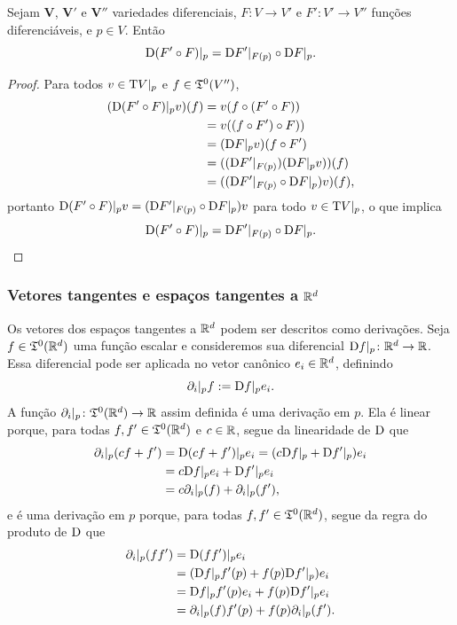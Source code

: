 \begin{proposition}
Sejam $\bm V$, $\bm V'$ e $\bm V''$ variedades diferenciais, $F\colon V \to V'$ e $F'\colon V' \to V''$ funções diferenciáveis, e $p \in V$. Então
	\begin{equation*}
	\mathrm{D}(F' \circ F)|_{p} = \mathrm{D} F'|_{F(p)} \circ \mathrm{D} F|_{p}.
	\end{equation*}
\end{proposition}
\begin{proof}
Para todos $v \in \mathrm{T} V|_p$ e $f \in \mathfrak{T}^0(V'')$,
	\begin{align*}
	(\mathrm{D}(F' \circ F)|_{p} v)(f) &= v(f \circ (F' \circ F)) \\
		&= v((f \circ F') \circ F)) \\
		&= (\mathrm{D} F|_p v)(f \circ F') \\
		&= ((\mathrm{D} F'|_{F(p)})(\mathrm{D} F|_{p} v))(f) \\
		&= ((\mathrm{D} F'|_{F(p)} \circ \mathrm{D} F|_{p}) v)(f),
	\end{align*}
portanto $\mathrm{D}(F' \circ F)|_{p}v = (\mathrm{D} F'|_{F(p)} \circ \mathrm{D} F|_{p})v$ para todo $v \in \mathrm{T} V|_p$, o que implica
	\begin{equation*}
	\mathrm{D}(F' \circ F)|_{p} = \mathrm{D} F'|_{F(p)} \circ \mathrm{D} F|_{p}. \qedhere
	\end{equation*}
\end{proof}

\subsubsection{Vetores tangentes e espaços tangentes a $\mathbb{R}^d$}

Os vetores dos espaços tangentes a $\mathbb{R}^d$ podem ser descritos como derivações. Seja $f \in \mathfrak{T}^0(\mathbb{R}^d)$ uma função escalar e consideremos sua diferencial $\mathrm{D} f|_p\colon \mathbb{R}^d \to \mathbb{R}$. Essa diferencial pode ser aplicada no vetor canônico $e_i \in \mathbb{R}^d$, definindo
	\begin{equation*}
	\partial_i|_p f := \mathrm{D} f|_p e_i.
	\end{equation*}
A função $\partial_i|_p\colon \mathfrak{T}^0(\mathbb{R}^d) \to \mathbb{R}$ assim definida é uma derivação em $p$. Ela é linear porque, para todas $f,f' \in \mathfrak{T}^0(\mathbb{R}^d)$ e $c \in \mathbb{R}$, segue da linearidade de $\mathrm{D}$ que
	\begin{align*}
	\partial_i|_p(cf+f') &= \mathrm{D}(cf+f')|_p e_i = (c\mathrm{D} f|_p + \mathrm{D} f'|_p) e_i \\
		&= c\mathrm{D} f|_pe_i + \mathrm{D} f'|_p e_i \\
		&= c\partial_i|_p(f) + \partial_i|_p(f'),
	\end{align*}
e é uma derivação em $p$ porque, para todas $f,f' \in \mathfrak{T}^0(\mathbb{R}^d)$, segue da regra do produto de $\mathrm{D}$ que
	\begin{align*}
	\partial_i|_p (ff') &= \mathrm{D} (ff')|_p e_i \\
		&= (\mathrm{D} f|_p f'(p) + f(p) \mathrm{D} f'|_p) e_i \\
		&= \mathrm{D} f|_p f'(p)e_i + f(p) \mathrm{D} f'|_p e_i \\
		&= \partial_i|_p(f) f'(p) + f(p)\partial_i|_p(f').
	\end{align*}

